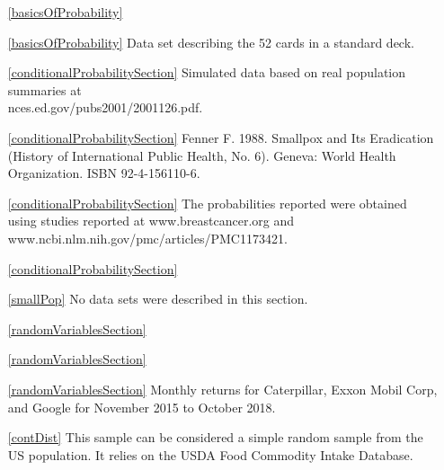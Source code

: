\begin{itemize}
\setlength{\itemsep}{0mm}
\item[\ref{basicsOfProbability}]
\item[\ref{basicsOfProbability}]
    Data set describing the 52 cards in a standard deck.

\item[\ref{conditionalProbabilitySection}]
    Simulated data based on real population summaries at \\
        {nces.ed.gov/pubs2001/2001126.pdf}.
\item[\ref{conditionalProbabilitySection}]
    Fenner F. 1988.
    Smallpox and Its Eradication
    (History of International Public Health, No. 6).
    Geneva: World Health Organization. ISBN 92-4-156110-6.

\item[\ref{conditionalProbabilitySection}]
    The probabilities reported were obtained using studies
    reported at
        {www.breastcancer.org}
    and 
        {www.ncbi.nlm.nih.gov/pmc/articles/PMC1173421}.

\item[\ref{conditionalProbabilitySection}]
    \madeup{}

\item[\ref{smallPop}]
    No data sets were described in this section.

\item[\ref{randomVariablesSection}]
    \madeup{}

\item[\ref{randomVariablesSection}]
    \madeup{}

\item[\ref{randomVariablesSection}]
    Monthly returns for Caterpillar, Exxon Mobil Corp,
    and Google for November 2015 to October 2018.

\item[\ref{contDist}]
    This sample can be considered a simple random sample
    from the US population.
    It relies on the USDA Food Commodity Intake Database.

\end{itemize}




